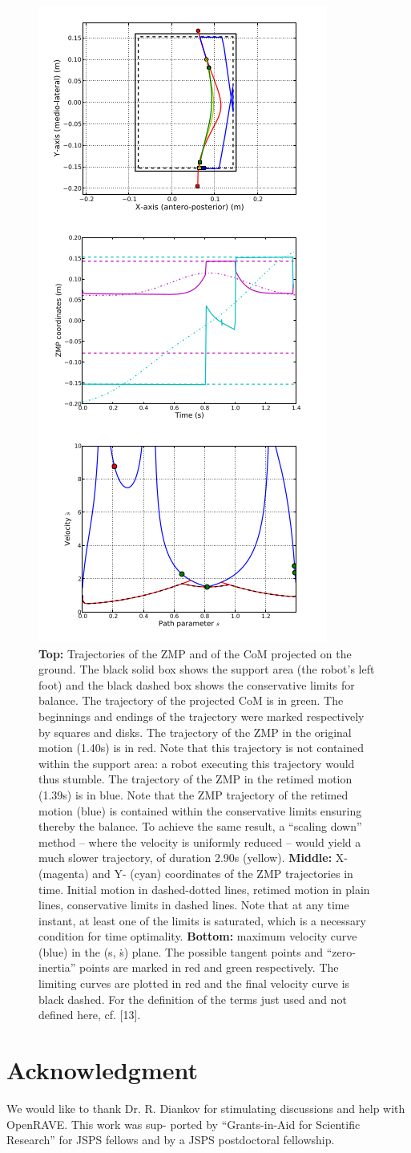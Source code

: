 \documentclass[journal]{IEEEtran}
\begin{document}
\begin{figure}
  \centering
  \includegraphics[width=.27\textwidth]{3.png}
  \caption{\textbf{Top:} Trajectories of the ZMP and of the CoM projected on the
ground. The black solid box shows the support area (the robot’s left foot)
and the black dashed box shows the conservative limits for balance. The
trajectory of the projected CoM is in green. The beginnings and endings of
the trajectory were marked respectively by squares and disks. The trajectory
of the ZMP in the original motion (1.40s) is in red. Note that this trajectory
is not contained within the support area: a robot executing this trajectory
would thus stumble. The trajectory of the ZMP in the retimed motion (1.39s)
is in blue. Note that the ZMP trajectory of the retimed motion (blue) is
contained within the conservative limits ensuring thereby the balance. To
achieve the same result, a “scaling down” method – where the velocity
is uniformly reduced – would yield a much slower trajectory, of duration
2.90s (yellow). \textbf{Middle:} X- (magenta) and Y- (cyan) coordinates of the ZMP
trajectories in time. Initial motion in dashed-dotted lines, retimed motion in
plain lines, conservative limits in dashed lines. Note that at any time instant,
at least one of the limits is saturated, which is a necessary condition for
time optimality. \textbf{Bottom:} maximum velocity curve (blue) in the (s, ṡ) plane.
The possible tangent points and “zero-inertia” points are marked in red
and green respectively. The limiting curves are plotted in red and the final
velocity curve is black dashed. For the definition of the terms just used and
not defined here, cf. [13].}
  \label{img3}
\end{figure}

\section*{Acknowledgment}
We would like to thank Dr. R. Diankov for stimulating
discussions and help with OpenRAVE. This work was sup-
ported by “Grants-in-Aid for Scientific Research” for JSPS
fellows and by a JSPS postdoctoral fellowship.
\end{document}
